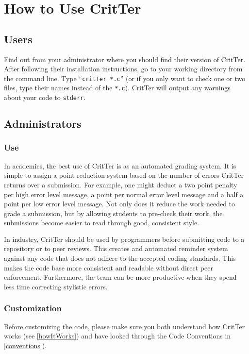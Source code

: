 \documentclass[12pt]{report}
\newcommand{\programName}{CritTer\xspace}
\begin{document}
\chapter{How to Use \programName}

\section{Users}
Find out from your administrator where you should find their version of \programName. After following 
their installation instructions, go to your working directory from the command line. Type 
``\lstinline{critTer *.c}'' (or if you only want to check one or two files, type their names instead of the 
\lstinline{*.c}).  \programName will output 
any warnings about your code to \lstinline{stderr}.

\section{Administrators}

\subsection{Use}
In academics, the best use of \programName is as an automated grading system. It is simple to assign a 
point reduction system based on the number of errors \programName returns over a submission. For 
example, one might deduct a two point penalty per high error level message, a point per normal error 
level message and a half a point per low error level message. Not only does it reduce the work needed 
to grade a submission, but by allowing students to pre-check their work, the submissions become easier 
to read through good, consistent style.

In industry, \programName should be used by programmers before submitting code to a repository or to 
peer reviews. This creates and automated reminder system against any code that does not adhere to the 
accepted coding standards. This makes the code base more consistent and readable without direct 
peer enforcement. Furthermore, the team can be more productive when they spend less time correcting 
stylistic errors.

\subsection{Customization}
Before customizing the code, please make sure you both understand how \programName works (see 
\autoref{howItWorks}) and have looked through the Code 
Conventions in \autoref{conventions}).
\end{document}
